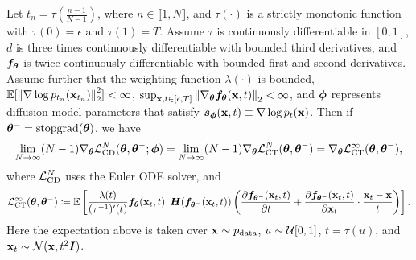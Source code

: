 \begin{appendices}
\begin{theorem}\label{thm:ctct}
    Let $t_n = \tau(\frac{n-1}{N-1})$, where $n \in \llbracket 1, N \rrbracket$, and $\tau(\cdot)$ is a strictly monotonic function with $\tau(0) = \epsilon$ and $\tau(1) = T$. Assume $\tau$ is continuously differentiable in $[0,1]$, $d$ is three times continuously differentiable with bounded third derivatives, and ${\bm{f}}_{{\bm{\theta}}}$ is twice continuously differentiable with bounded first and second derivatives. Assume further that the weighting function $\lambda(\cdot)$ is bounded, $\mathbb{E}[\left\lVert\nabla \log p_{t_n}({\mathbf{x}}_{t_{n}})\right\rVert_2^2] < \infty$, $\sup_{{\mathbf{x}}, t\in[\epsilon, T]}\left\lVert\nabla_{\bm{\theta}} {\bm{f}}_{\bm{\theta}}({\mathbf{x}}, t)\right\rVert_2 < \infty$, and ${\bm{\phi}}$ represents diffusion model parameters that satisfy ${\bm{s}}_{\bm{\phi}}({\mathbf{x}}, t) \equiv \nabla \log p_t({\mathbf{x}})$. Then if ${\bm{\theta}}^{-} = \operatorname{stopgrad}({\bm{\theta}})$, we have
    \begin{align}
        \lim_{N \to \infty} (N-1)\nabla_{\bm{\theta}} \mathcal{L}_\text{CD}^N({\bm{\theta}}, {\bm{\theta}}^{-}; {\bm{\phi}}) = \lim_{N \to \infty} (N-1)\nabla_{\bm{\theta}} \mathcal{L}_\text{CT}^N({\bm{\theta}}, {\bm{\theta}}^{-}) = \nabla_{\bm{\theta}} \mathcal{L}_\text{CT}^\infty({\bm{\theta}}, {\bm{\theta}}^{-}),\label{eq:ctct_obj}
    \end{align}
    where $\mathcal{L}^N_\text{CD}$ uses the Euler ODE solver, and
    \begin{align}
        \mathcal{L}_\text{CT}^{\infty} ({\bm{\theta}}, {\bm{\theta}}^{-}) \coloneqq \mathbb{E}\left[\frac{\lambda(t)}{(\tau^{-1})'(t)} {\bm{f}}_{\bm{\theta}}({\mathbf{x}}_t, t) ^{\mkern-1.5mu\mathsf{T}} {\bm{H}}({\bm{f}}_{{\bm{\theta}}^-}({\mathbf{x}}_t, t)) \left(\frac{\partial {\bm{f}}_{{\bm{\theta}}^-}({\mathbf{x}}_t, t)}{\partial t} + \frac{\partial {\bm{f}}_{{\bm{\theta}}^-}({\mathbf{x}}_t, t)}{\partial {\mathbf{x}}_t} \cdot \frac{{\mathbf{x}}_t - {\mathbf{x}}}{t}\right)\right].
    \end{align}
    Here the expectation above is taken over ${\mathbf{x}} \sim p_\text{data}$, $u\sim\mathcal{U}[0,1]$, $t=\tau(u)$, and ${\mathbf{x}}_t \sim \mathcal{N}({\mathbf{x}}, t^2{\bm{I}})$.
\end{theorem}


\end{appendices}
